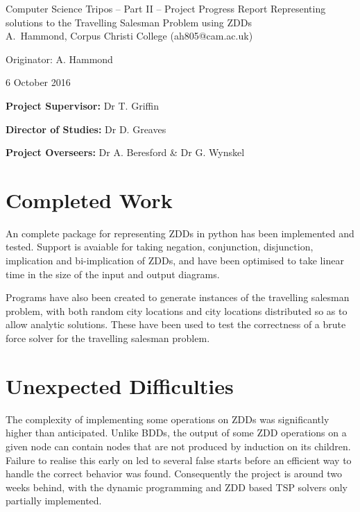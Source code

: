 \documentclass[12pt,a4paper,twoside]{article}
\begin{document}
\begin{center}
\Large
Computer Science Tripos -- Part II -- Project Progress Report
\LARGE
Representing solutions to the Travelling Salesman Problem using ZDDs\\[4mm]

\large
A.~Hammond, Corpus Christi College (ah805@cam.ac.uk)

Originator: A. Hammond

6 October 2016
\end{center}

\vspace{5mm}

\textbf{Project Supervisor:} Dr T. Griffin

\textbf{Director of Studies:} Dr D. Greaves

\textbf{Project Overseers:} Dr A. Beresford  \& Dr G. Wynskel


\section*{Completed Work}

An complete package for representing ZDDs in python has been implemented and tested. Support is avaiable for taking negation, conjunction, disjunction, implication and bi-implication of ZDDs, and have been optimised to take linear time in the size of the input and output diagrams.

Programs have also been created to generate instances of the travelling salesman problem, with both random city locations and city locations distributed so as to allow analytic solutions. These have been used to test the correctness of a brute force solver for the travelling salesman problem.

\section*{Unexpected Difficulties}

The complexity of implementing some operations on ZDDs was significantly higher than anticipated. Unlike BDDs, the output of some ZDD operations on a given node can contain nodes that are not produced by induction on its children. Failure to realise this early on led to several false starts before an efficient way to handle the correct behavior was found. Consequently the project is around two weeks behind, with the dynamic programming and ZDD based TSP solvers only partially implemented.
\end{document}
